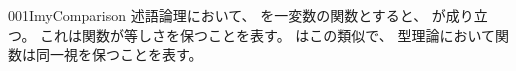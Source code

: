 \documentclass[index]{subfiles}
\begin{document}
\begin{myBlock}{001I}{myComparison}
  述語論理において、
  を一変数の関数とすると、
  が成り立つ。
  これは関数が等しさを保つことを表す。
  はこの類似で、
  型理論において関数は同一視を保つことを表す。
\end{myBlock}
\end{document}
